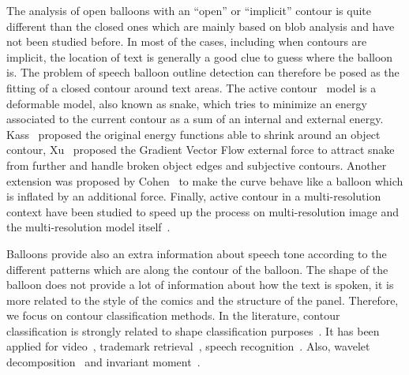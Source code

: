 The analysis of open balloons with an ``open'' or ``implicit'' contour is quite different than the closed ones which are mainly based on blob analysis and have not been studied before.
In most of the cases, including when contours are implicit, the location of text is generally a good clue to guess where the balloon is.
The problem of speech balloon outline detection can therefore be posed as the fitting of a closed contour around text areas.
The active contour~\cite{Kass1988} model is a deformable model, also known as snake, which tries to minimize an energy associated to the current contour as a sum of an internal and external energy.
Kass~\cite{Kass1988} proposed the original energy functions able to shrink around an object contour, Xu~\cite{Xu1998} proposed the Gradient Vector Flow external force to attract snake from further and handle broken object edges and subjective contours.
Another extension was proposed by Cohen~\cite{Cohen1991} to make the curve behave like a balloon which is inflated by an additional force.
Finally, active contour in a multi-resolution context have been studied to speed up the process on multi-resolution image and the multi-resolution model itself~\cite{Leroy1996}.


Balloons provide also an extra information about speech tone according to the different patterns which are along the contour of the balloon.
The shape of the balloon does not provide a lot of information about how the text is spoken, it is more related to the style of the comics and the structure of the panel.
Therefore, we focus on contour classification methods.
In the literature, contour classification is strongly related to shape classification purposes~\cite{sun2005classification,liu1990partial}.
It has been applied for video~\cite{kuhne2001motion,richter2001contour,bader2009}, trademark retrieval~\cite{leung2002trademark}, speech recognition~\cite{grigoriu1994automatic}.
Also, wavelet decomposition~\cite{tieng1997recognition} and invariant moment~\cite{mukundan1998moment}. 

